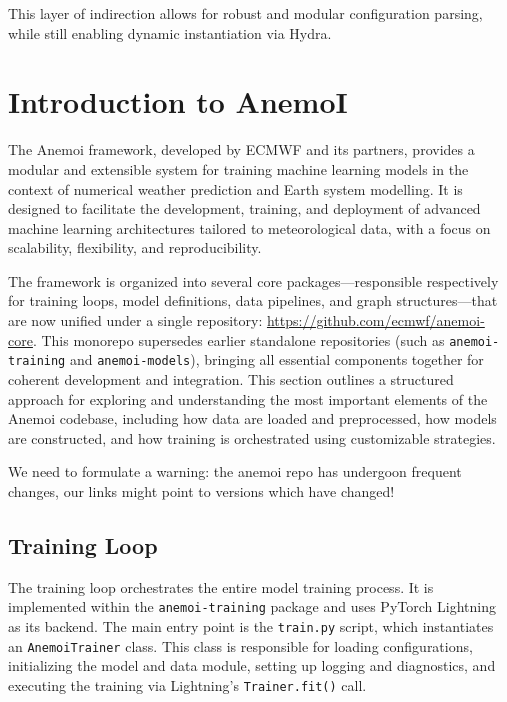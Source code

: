 This layer of indirection allows for robust and modular configuration parsing, while still enabling dynamic instantiation via Hydra.

%
\section{Introduction to AnemoI}

The Anemoi framework, developed by ECMWF and its partners, provides a modular and extensible system for training machine learning models in the context of numerical weather prediction and Earth system modelling. It is designed to facilitate the development, training, and deployment of advanced machine learning architectures tailored to meteorological data, with a focus on scalability, flexibility, and reproducibility. 

The framework is organized into several core packages—responsible respectively for training loops, model definitions, data pipelines, and graph structures—that are now unified under a single repository: \url{https://github.com/ecmwf/anemoi-core}. This monorepo supersedes earlier standalone repositories (such as \texttt{anemoi-training} and \texttt{anemoi-models}), bringing all essential components together for coherent development and integration. This section outlines a structured approach for exploring and understanding the most important elements of the Anemoi codebase, including how data are loaded and preprocessed, how models are constructed, and how training is orchestrated using customizable strategies.

We need to formulate a warning: the anemoi repo has undergoon frequent changes, our links might point to versions which have changed!

%
\subsection{Training Loop}

The training loop orchestrates the entire model training process. It is implemented within the \texttt{anemoi-training} package and uses PyTorch Lightning as its backend. The main entry point is the \texttt{train.py} script, which instantiates an \texttt{AnemoiTrainer} class. This class is responsible for loading configurations, initializing the model and data module, setting up logging and diagnostics, and executing the training via Lightning's \texttt{Trainer.fit()} call.

